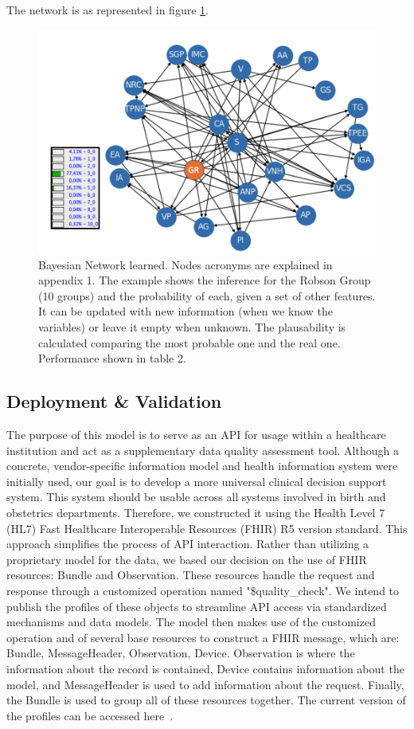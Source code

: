 The network is as represented in figure \ref{fig:network}.
\begin{figure}[htbp]
\centering
\caption{Bayesian Network learned. Nodes acronyms are explained in appendix 1. The example shows the inference for the Robson Group (10 groups) and the probability of each, given a set of other features. It can be updated with new information (when we know the variables) or leave it empty when unknown. The plausability is calculated comparing the most probable one and the real one. Performance shown in table 2.}\label{fig:network} 
\includegraphics[scale=0.38]{figures/new-bn.png}
\end{figure}



\subsection{Deployment \& Validation}

The purpose of this model is to serve as an API for usage within a healthcare institution and act as a supplementary data quality assessment tool. Although a concrete, vendor-specific information model and health information system were initially used, our goal is to develop a more universal clinical decision support system. This system should be usable across all systems involved in birth and obstetrics departments. Therefore, we constructed it using the Health Level 7 (HL7) Fast Healthcare Interoperable Resources (FHIR) R5 version standard. This approach simplifies the process of API interaction. Rather than utilizing a proprietary model for the data, we based our decision on the use of FHIR resources: Bundle and Observation. These resources handle the request and response through a customized operation named "\$quality\_check". We intend to publish the profiles of these objects to streamline API access via standardized mechanisms and data models. The model then makes use of the customized operation and of several base resources to construct a FHIR message, which are: Bundle, MessageHeader, Observation, Device. Observation is where the information about the record is contained, Device contains information about the model, and MessageHeader is used to add information about the request. Finally, the Bundle is used to group all of these resources together. The current version of the profiles can be accessed here\unskip~\cite{almeidaObstetricsClinicalDecision}. 

